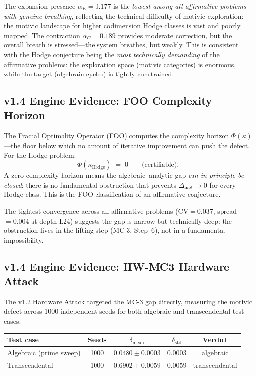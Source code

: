 \documentclass[11pt]{article}
\theoremstyle{definition}
\begin{document}
\noindent
The expansion presence $\alpha_E = 0.177$ is the \emph{lowest among all
affirmative problems with genuine breathing}, reflecting the technical
difficulty of motivic exploration: the motivic landscape for higher
codimension Hodge classes is vast and poorly mapped.  The contraction
$\alpha_C = 0.189$ provides moderate correction, but the overall breath
is stressed---the system breathes, but weakly.  This is consistent with
the Hodge conjecture being the \emph{most technically demanding} of the
affirmative problems: the exploration space (motivic categories) is
enormous, while the target (algebraic cycles) is tightly constrained.

\subsection{v1.4 Engine Evidence: FOO Complexity Horizon}
\label{sec:foo}

The Fractal Optimality Operator (FOO) computes the complexity horizon
$\Phi(\kappa)$---the floor below which no amount of iterative improvement
can push the defect.  For the Hodge problem:
\[
  \Phi(\kappa_{\mathrm{Hodge}}) \;=\; 0 \qquad\text{(certifiable)}.
\]
A zero complexity horizon means the algebraic--analytic gap \emph{can in
principle be closed}: there is no fundamental obstruction that prevents
$\Delta_{\mathrm{mot}} \to 0$ for every Hodge class.  This is the FOO
classification of an affirmative conjecture.

The tightest convergence across all affirmative problems
($\mathrm{CV} = 0.037$, spread $= 0.004$ at depth L24) suggests the
gap is narrow but technically deep: the obstruction lives in the lifting
step (MC-3, Step~6), not in a fundamental impossibility.

\subsection{v1.4 Engine Evidence: HW-MC3 Hardware Attack}
\label{sec:hw-mc3}

The v1.2 Hardware Attack targeted the MC-3 gap directly, measuring the
motivic defect across 1000 independent seeds for both algebraic and
transcendental test cases:

\begin{center}
\begin{tabular}{lcccc}
\hline
\textbf{Test case} & \textbf{Seeds} & $\delta_{\mathrm{mean}}$ &
  $\delta_{\mathrm{std}}$ & \textbf{Verdict} \\
\hline
Algebraic (prime sweep) & 1000 &
  $0.0480 \pm 0.0003$ & $0.0003$ & algebraic \\
Transcendental & 1000 &
  $0.6902 \pm 0.0059$ & $0.0059$ & transcendental \\
\hline
\end{tabular}
\end{center}
\end{document}
